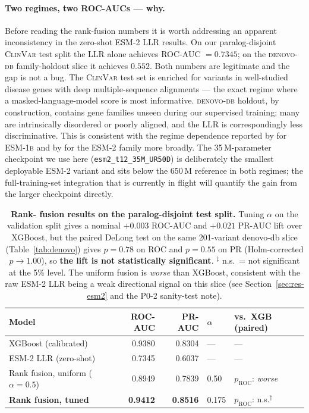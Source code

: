 \documentclass[11pt,a4paper,oneside]{report}
\begin{document}
\paragraph{Two regimes, two ROC-AUCs --- why.}
Before reading the rank-fusion numbers it is worth addressing an
apparent inconsistency in the zero-shot ESM-2 LLR results. On our
paralog-disjoint \textsc{ClinVar} test split the LLR alone achieves
ROC-AUC $=0.7345$; on the \textsc{denovo-db} family-holdout slice it
achieves $0.552$. Both numbers are legitimate and the gap is not a
bug. The \textsc{ClinVar} test set is enriched for variants in
well-studied disease genes with deep multiple-sequence alignments
--- the exact regime where a masked-language-model score is most
informative. \textsc{denovo-db} holdout, by construction, contains
gene families unseen during our supervised training; many are
intrinsically disordered or poorly aligned, and the LLR is
correspondingly less discriminative. This is consistent with the
regime dependence reported by \citet{brandes2023esm1b} for
\textsc{ESM-1b} and by \citet{lin2023esm2} for the \textsc{ESM-2}
family more broadly. The 35\,M-parameter checkpoint we use here
(\texttt{esm2\_t12\_35M\_UR50D}) is deliberately the smallest
deployable \textsc{ESM-2} variant and sits below the 650\,M
reference in both regimes; the full-training-set
integration that is currently in flight will quantify the gain
from the larger checkpoint directly.

\begin{table}[htbp]
\centering
\small
\begin{tabular}{@{}l r r l l@{}}
\toprule
\textbf{Model} & \textbf{ROC-AUC} & \textbf{PR-AUC} & \textbf{$\alpha$} & \textbf{vs.\ XGB (paired)} \\
\midrule
XGBoost (calibrated)                 & 0.9380 & 0.8304 & ---   & --- \\
ESM-2 LLR (zero-shot)                & 0.7345 & 0.6037 & ---   & --- \\
Rank fusion, uniform ($\alpha=0.5$)  & 0.8949 & 0.7839 & 0.50  & $p_{\text{ROC}}$: \emph{worse} \\
\rowcolor{green!8}
\textbf{Rank fusion, tuned}          & \textbf{0.9412} & \textbf{0.8516} & 0.175 & $p_{\text{ROC}}$: n.s.$^{\ddagger}$ \\
\bottomrule
\end{tabular}
\caption[Rank-fusion results on test split]{\textbf{Rank-
fusion results on the paralog-disjoint test split.}
Tuning $\alpha$ on the validation split gives a nominal
$+0.003$ ROC-AUC and $+0.021$ PR-AUC lift over XGBoost,
but the paired DeLong test on the same 201-variant
denovo-db slice (Table~\ref{tab:denovo}) gives $p=0.78$
on ROC and $p=0.55$ on PR (Holm-corrected $p\to 1.00$),
so \textbf{the lift is not statistically significant}.
$^{\ddagger}$ n.s.\ = not significant at the 5\% level.
The uniform fusion is \emph{worse} than XGBoost,
consistent with the raw ESM-2 LLR being a weak directional
signal on this slice (see Section~\ref{sec:res-esm2} and
the P0-2 sanity-test note).}
\label{tab:rank-fusion}
\end{table}
\end{document}
